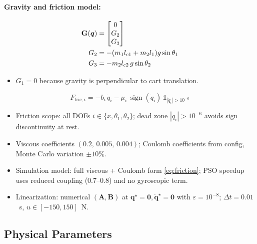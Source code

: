 \documentclass[10pt, a4paper]{article}
\newcommand{\vq}{\boldsymbol{q}}
\newcommand{\Gq}{\mathbf{G}(\vq)}
\newcommand{\sign}{\operatorname{sign}}
\begin{document}
\paragraph{Gravity and friction model:}
\begin{align}
  \Gq &= \begin{bmatrix} 0 \\ G_2 \\ G_3 \end{bmatrix} \notag\\
  G_2 &= -(m_1 l_{c1} + m_2 l_1)g\sin\theta_1 \notag\\
  G_3 &= -m_2 l_{c2}\,g\sin\theta_2
  \label{eq:Gvec}
\end{align}
\begin{itemize}[leftmargin=1.5em,itemsep=0.2em]
  \item $G_1 = 0$ because gravity is perpendicular to cart translation.
\end{itemize}
\begin{equation}
  F_{\text{fric},i} = -b_i\,\dot{q}_i
    - \mu_i\,\sign(\dot{q}_i)\,\mathbb{1}_{|\dot{q}_i|>10^{-6}}
  \label{eq:friction}
\end{equation}
\begin{itemize}[leftmargin=1.5em,itemsep=0.2em]
  \item Friction scope: all DOFs $i\in\{x,\theta_1,\theta_2\}$; dead zone
  $|\dot{q}_i|>10^{-6}$ avoids sign discontinuity at rest.
  \item Viscous coefficients $(0.2,\,0.005,\,0.004)$; Coulomb coefficients
  from config, Monte Carlo variation $\pm10\%$.
  \item Simulation model: full viscous + Coulomb form \eqref{eq:friction};
  PSO speedup uses reduced coupling (0.7--0.8) and no gyroscopic term.
  \item Linearization: numerical $(\mathbf{A},\mathbf{B})$ at
  $\vq^\star=\mathbf{0},\dot{\vq}^\star=\mathbf{0}$ with $\varepsilon=10^{-8}$;
  $\Delta t=0.01$~s, $u\in[-150,150]$~N.
\end{itemize}

\subsection{Physical Parameters}
\end{document}
